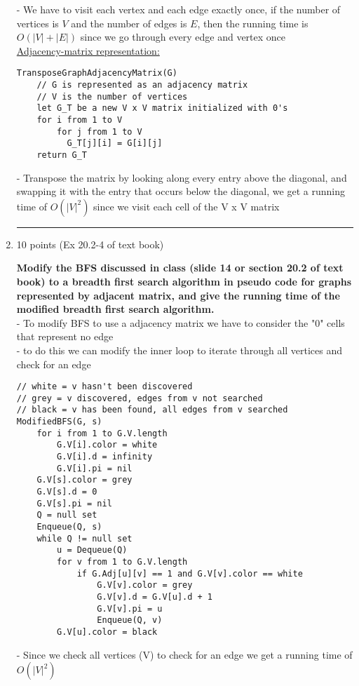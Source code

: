 \documentclass[letterpaper,12pt]{article}
\begin{document}
\begin{enumerate}
\begin{verbatim}
\end{verbatim}
- We have to visit each vertex and each edge exactly once, if the number of vertices is $V$ and the number of edges is $E$, then the running time is $O(|V|+|E|)$ since we go through every edge and vertex once \\

\underline{Adjacency-matrix representation:}
\begin{verbatim}
TransposeGraphAdjacencyMatrix(G)
    // G is represented as an adjacency matrix
    // V is the number of vertices
    let G_T be a new V x V matrix initialized with 0's
    for i from 1 to V
        for j from 1 to V
          G_T[j][i] = G[i][j]
    return G_T
\end{verbatim}
- Transpose the matrix by looking along every entry above the diagonal, and swapping it with the entry that occurs below the diagonal, we get a running time of $O(|V|^2)$ since we visit each cell of the V x V matrix\\


\noindent\rule{16cm}{0.1pt}
\item 10 points (Ex 20.2-4 of text book)

\textbf{Modify the BFS discussed in class (slide 14 or section 20.2 of text book)
to a breadth first search algorithm in pseudo code for graphs represented by
adjacent matrix, and give the running time of the modified breadth first
search algorithm.} \\
- To modify BFS to use a adjacency matrix we have to consider the "0" cells that represent no edge \\
- to do this we can modify the inner loop to iterate through all vertices and check for an edge \\
\begin{verbatim}
// white = v hasn't been discovered
// grey = v discovered, edges from v not searched
// black = v has been found, all edges from v searched
ModifiedBFS(G, s)
    for i from 1 to G.V.length
        G.V[i].color = white
        G.V[i].d = infinity
        G.V[i].pi = nil
    G.V[s].color = grey
    G.V[s].d = 0
    G.V[s].pi = nil
    Q = null set
    Enqueue(Q, s)
    while Q != null set
        u = Dequeue(Q)
        for v from 1 to G.V.length
            if G.Adj[u][v] == 1 and G.V[v].color == white
                G.V[v].color = grey
                G.V[v].d = G.V[u].d + 1
                G.V[v].pi = u
                Enqueue(Q, v)
        G.V[u].color = black
\end{verbatim}
- Since we check all vertices (V) to check for an edge we get a running time of $O(|V|^2)$


\end{enumerate}
\end{document}
